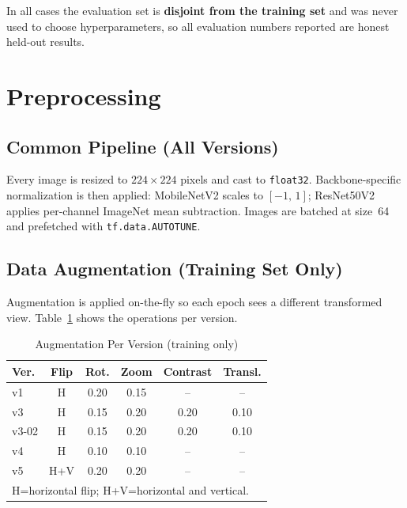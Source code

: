 \documentclass[conference]{IEEEtran}
\begin{document}
In all cases the evaluation set is \textbf{disjoint from the training
set} and was never used to choose hyperparameters, so all evaluation
numbers reported are honest held-out results.

\section{Preprocessing}

\subsection{Common Pipeline (All Versions)}
Every image is resized to $224 \times 224$ pixels and cast to
\texttt{float32}. Backbone-specific normalization is then applied:
MobileNetV2 scales to $[-1,\,1]$; ResNet50V2 applies per-channel
ImageNet mean subtraction. Images are batched at size~64 and
prefetched with \texttt{tf.data.AUTOTUNE}.

\subsection{Data Augmentation (Training Set Only)}
Augmentation is applied on-the-fly so each epoch sees a different
transformed view. Table~\ref{tab:aug} shows the operations per version.

\begin{table}[htbp]
  \caption{Augmentation Per Version (training only)}
  \begin{center}
  \begin{tabular}{l c c c c c}
    \toprule
    \textbf{Ver.} & \textbf{Flip} & \textbf{Rot.} & \textbf{Zoom}
      & \textbf{Contrast} & \textbf{Transl.} \\
    \midrule
    v1    & H   & 0.20 & 0.15 &  --  &  --  \\
    v3    & H   & 0.15 & 0.20 & 0.20 & 0.10 \\
    v3-02 & H   & 0.15 & 0.20 & 0.20 & 0.10 \\
    v4    & H   & 0.10 & 0.10 &  --  &  --  \\
    v5    & H+V & 0.20 & 0.20 &  --  &  --  \\
    \bottomrule
    \multicolumn{6}{l}{\footnotesize H=horizontal flip; H+V=horizontal and vertical.}\\
  \end{tabular}
  \label{tab:aug}
  \end{center}
\end{table}
\end{document}
